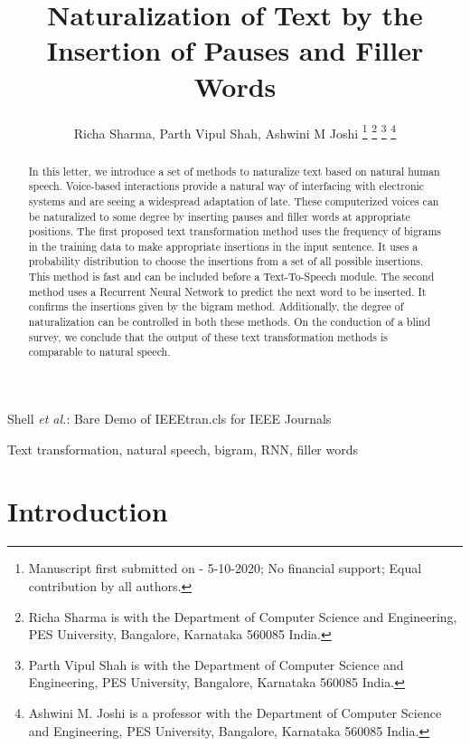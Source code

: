 \documentclass[journal]{IEEEtran}
\begin{document}
\title{Naturalization of Text by the Insertion of Pauses and Filler Words}

\author{Richa Sharma, Parth Vipul Shah, Ashwini M Joshi 
\thanks{Manuscript first submitted on - 5-10-2020; No financial support; Equal contribution by all authors.}
\thanks{Richa Sharma is with the Department of Computer Science and Engineering, PES University, Bangalore, Karnataka 560085 India.}
\thanks{Parth Vipul Shah is with the Department of Computer Science and Engineering, PES University, Bangalore, Karnataka 560085 India.}
\thanks{Ashwini M. Joshi is a professor with the Department of Computer Science and Engineering, PES University, Bangalore, Karnataka 560085 India.}
}

{Shell \MakeLowercase{\textit{et al.}}: Bare Demo of IEEEtran.cls for IEEE Journals}
\maketitle

\begin{abstract}
In this letter, we introduce a set of methods to naturalize text based on natural human speech. Voice-based interactions provide a natural way of interfacing with electronic systems and are seeing a widespread adaptation of late. These computerized voices can be naturalized to some degree by inserting pauses and filler words at appropriate positions. The first proposed text transformation method uses the frequency of bigrams in the training data to make appropriate insertions in the input sentence. It uses a probability distribution to choose the insertions from a set of all possible insertions. This method is fast and can be included before a Text-To-Speech module. The second method uses a Recurrent Neural Network to predict the next word to be inserted. It confirms the insertions given by the bigram method. Additionally, the degree of naturalization can be controlled in both these methods. On the conduction of a blind survey, we conclude that the output of these text transformation methods is comparable to natural speech.
\end{abstract}

\begin{IEEEkeywords}
Text transformation, natural speech, bigram, RNN, filler words
\end{IEEEkeywords}

\IEEEpeerreviewmaketitle

\section{Introduction}
\end{document}
